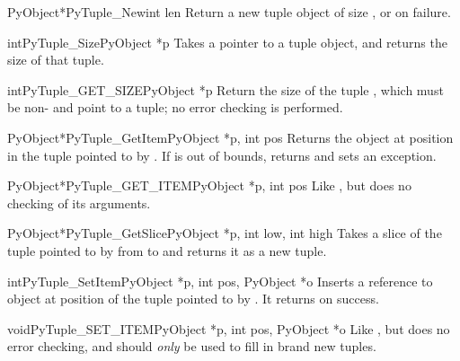 \begin{cfuncdesc}{PyObject*}{PyTuple_New}{int len}
  Return a new tuple object of size , or \NULL{} on failure.
\end{cfuncdesc}

\begin{cfuncdesc}{int}{PyTuple_Size}{PyObject *p}
  Takes a pointer to a tuple object, and returns the size of that
  tuple.
\end{cfuncdesc}

\begin{cfuncdesc}{int}{PyTuple_GET_SIZE}{PyObject *p}
  Return the size of the tuple , which must be non-\NULL{} and
  point to a tuple; no error checking is performed.
\end{cfuncdesc}

\begin{cfuncdesc}{PyObject*}{PyTuple_GetItem}{PyObject *p, int pos}
  Returns the object at position  in the tuple pointed to by
  .  If  is out of bounds, returns \NULL{} and sets an
   exception.
\end{cfuncdesc}

\begin{cfuncdesc}{PyObject*}{PyTuple_GET_ITEM}{PyObject *p, int pos}
  Like , but does no checking of its
  arguments.
\end{cfuncdesc}

\begin{cfuncdesc}{PyObject*}{PyTuple_GetSlice}{PyObject *p,
                                               int low, int high}
  Takes a slice of the tuple pointed to by  from  to
   and returns it as a new tuple.
\end{cfuncdesc}

\begin{cfuncdesc}{int}{PyTuple_SetItem}{PyObject *p,
                                        int pos, PyObject *o}
  Inserts a reference to object  at position  of the
  tuple pointed to by . It returns  on success.
\end{cfuncdesc}

\begin{cfuncdesc}{void}{PyTuple_SET_ITEM}{PyObject *p,
                                          int pos, PyObject *o}
  Like , but does no error checking, and
  should \emph{only} be used to fill in brand new tuples.  
\end{cfuncdesc}

